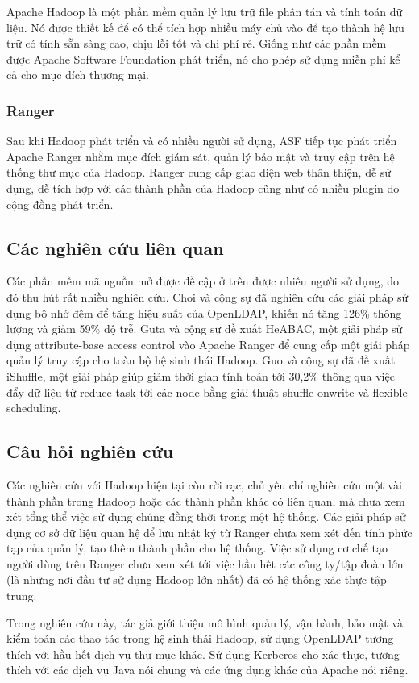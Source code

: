Apache Hadoop là một phần mềm quản lý lưu trữ file phân tán và tính toán dữ liệu. Nó được thiết kế để có thể tích hợp nhiều máy chủ vào để tạo thành hệ lưu trữ có tính sẵn sàng cao, chịu lỗi tốt và chi phí rẻ. Giống như các phần mềm được Apache Software Foundation phát triển, nó cho phép sử dụng miễn phí kể cả cho mục đích thương mại. 

\subsubsection{Ranger}

Sau khi Hadoop phát triển và có nhiều người sử dụng, ASF tiếp tục phát triển Apache Ranger nhằm mục đích giám sát, quản lý bảo mật và truy cập trên hệ thống thư mục của Hadoop. Ranger cung cấp giao diện web thân thiện, dễ sử dụng, dễ tích hợp với các thành phần của Hadoop cũng như có nhiều plugin do cộng đồng phát triển.

\subsection{Các nghiên cứu liên quan}

Các phần mềm mã nguồn mở được đề cập ở trên được nhiều người sử dụng, do đó thu hút rất nhiều nghiên cứu. Choi và cộng sự \cite{choi2003enhancing} đã nghiên cứu các giải pháp sử dụng bộ nhớ đệm để tăng hiệu suất của OpenLDAP, khiến nó tăng 126\% thông lượng và giảm 59\% độ trễ. Guta và cộng sự \cite{gupta2018attribute} đề xuất HeABAC, một giải pháp sử dụng attribute-base access control vào Apache Ranger để cung cấp một giải pháp quản lý truy cập cho toàn bộ hệ sinh thái Hadoop. Guo và cộng sự \cite{guo2016ishuffle} đã đề xuất iShuffle, một giải pháp giúp giảm thời gian tính toán tới 30,2\% thông qua việc đẩy dữ liệu từ reduce task tới các node bằng giải thuật shuffle-onwrite và  flexible scheduling.

\subsection{Câu hỏi nghiên cứu}

Các nghiên cứu với Hadoop hiện tại còn rời rạc, chủ yếu chỉ nghiên cứu một vài thành phần trong Hadoop hoặc các thành phần khác có liên quan, mà chưa xem xét tổng thể việc sử dụng chúng đồng thời trong một hệ thống. Các giải pháp sử dụng cơ sở dữ liệu quan hệ để lưu nhật ký từ Ranger chưa xem xét đến tính phức tạp của quản lý, tạo thêm thành phần cho hệ thống. Việc sử dụng cơ chế tạo người dùng trên Ranger chưa xem xét tới việc hầu hết các công ty/tập đoàn lớn (là những nơi đầu tư sử dụng Hadoop lớn nhất) đã có hệ thống xác thực tập trung.

Trong nghiên cứu này, tác giả giới thiệu mô hình quản lý, vận hành, bảo mật và kiểm toán các thao tác trong hệ sinh thái Hadoop, sử dụng OpenLDAP tương thích với hầu hết dịch vụ thư mục khác. Sử dụng Kerberos cho xác thực, tương thích với các dịch vụ Java nói chung và các ứng dụng khác của Apache nói riêng.